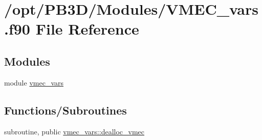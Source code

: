 \hypertarget{VMEC__vars_8f90}{}\section{/opt/\+P\+B3\+D/\+Modules/\+V\+M\+E\+C\+\_\+vars.f90 File Reference}
\label{VMEC__vars_8f90}
\subsection*{Modules}
\begin{DoxyCompactItemize}
\item 
module \hyperlink{namespacevmec__vars}{vmec\+\_\+vars}
\end{DoxyCompactItemize}
\subsection*{Functions/\+Subroutines}
\begin{DoxyCompactItemize}
\item 
subroutine, public \hyperlink{namespacevmec__vars_ace63f2f143043b860f7705dff7089676}{vmec\+\_\+vars\+::dealloc\+\_\+vmec}
\end{DoxyCompactItemize}
